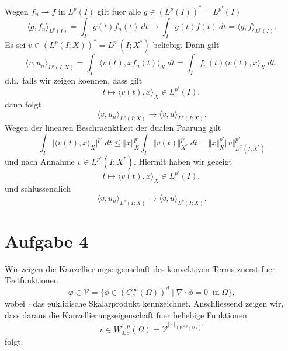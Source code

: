 \documentclass{article}
\begin{document}
Wegen $f_n \rightharpoonup f$ in $L^p(I)$ gilt fuer alle $g \in (L^p(I))^* = L^{p'}(I)$
\begin{equation*}
  \langle g, f_n \rangle_{L^p(I)}
  = \int_{I}^{} g(t) f_n(t) \ dt
  \rightarrow
  \int_{I}^{} g(t) f(t) \ dt
  = \langle g, f \rangle_{L^p(I)}.
\end{equation*}
Es sei $v \in (L^p(I; X))^* = L^{p'}(I; X^*)$ beliebig. Dann gilt
\begin{equation*}
  \langle v, u_n \rangle_{L^p(I; X)}
  = \int_{I}^{} \langle v(t), x f_n(t) \rangle_X \ dt
  = \int_{I}^{} f_n(t) \langle v(t), x \rangle_X \ dt,
\end{equation*}
d.h.\ falls wir zeigen koennen, dass gilt
\begin{equation*}
  t \mapsto \langle v(t), x \rangle_X
  \in L^{p'}(I),
\end{equation*}
dann folgt
\begin{equation*}
  \langle v, u_n \rangle_{L^p(I; X)}
  \rightarrow
  \langle v, u \rangle_{L^p(I; X)}.
\end{equation*}
Wegen der linearen Beschraenktheit der dualen Paarung gilt
\begin{equation*}
  \int_{I}^{} \vert \langle v(t), x \rangle_X \vert^{p'} \ dt
  \leq \Vert x \Vert_X^{p'} \int_{I}^{} \Vert v(t) \Vert_{X^*}^{p'} \ dt
  = \Vert x \Vert_X^{p'} \Vert v \Vert_{L^{p'}(I; X^*)}^{p'}
\end{equation*}
und nach Annahme $v \in L^{p'}(I; X^*)$. Hiermit haben wir gezeigt
\begin{equation*}
  t \mapsto \langle v(t), x \rangle_X
  \in L^{p'}(I),
\end{equation*}
und schlussendlich
\begin{equation*}
  \langle v, u_n \rangle_{L^p(I; X)}
  \rightarrow
  \langle v, u \rangle_{L^p(I; X)}.
\end{equation*}

\section*{Aufgabe 4}

Wir zeigen die Kanzellierungseigenschaft des konvektiven Terms zuerst fuer Testfunktionen 
\begin{equation*}
  \varphi \in \mathcal{V}
  = \{\phi \in (C_c^\infty(\Omega))^d \mid \nabla \cdot \phi = 0 \; \; \text{in} \; \Omega\},
\end{equation*}
wobei $\cdot$ das euklidische Skalarprodukt kennzeichnet. Anschliessend zeigen wir, dass daraus die Kanzellierungseigenschaft fuer beliebige Funktionen
\begin{equation*}
  v \in W_{0, \sigma}^{1,p}(\Omega)
  = \overline{\mathcal{V}}^{\Vert \cdot \Vert_{(W^{1,p}(\Omega))^d}}
\end{equation*}
folgt.
\end{document}
